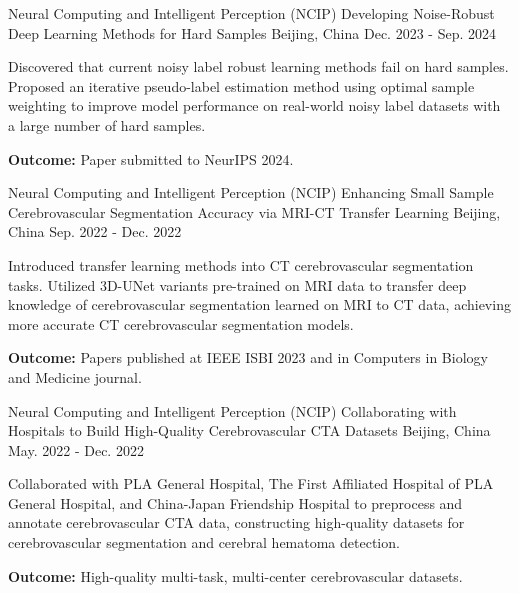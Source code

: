 \begin{cventries}
  \cventry
  {Neural Computing and Intelligent Perception (NCIP)}
  {Developing Noise-Robust Deep Learning Methods for Hard Samples}
  {Beijing, China}
  {Dec. 2023 - Sep. 2024}
  {
    \begin{cvitems}
      \item {Discovered that current noisy label robust learning methods fail on hard samples. Proposed an iterative pseudo-label estimation method using optimal sample weighting to improve model performance on real-world noisy label datasets with a large number of hard samples.}
      \item {\textbf{Outcome:} Paper submitted to NeurIPS 2024.}
    \end{cvitems}
  }
  \expsaddspace
  \cventry
  {Neural Computing and Intelligent Perception (NCIP)}
  {Enhancing Small Sample Cerebrovascular Segmentation Accuracy via MRI-CT Transfer Learning}
  {Beijing, China}
  {Sep. 2022 - Dec. 2022}
  {
    \begin{cvitems}
      \item {Introduced transfer learning methods into CT cerebrovascular segmentation tasks. Utilized 3D-UNet variants pre-trained on MRI data to transfer deep knowledge of cerebrovascular segmentation learned on MRI to CT data, achieving more accurate CT cerebrovascular segmentation models.}
      \item {\textbf{Outcome:} Papers published at IEEE ISBI 2023 and in Computers in Biology and Medicine journal.}
    \end{cvitems}
  }
  \expsaddspace
  \cventry
  {Neural Computing and Intelligent Perception (NCIP)}
  {Collaborating with Hospitals to Build High-Quality Cerebrovascular CTA Datasets}
  {Beijing, China}
  {May. 2022 - Dec. 2022}
  {
    \begin{cvitems}
      \item {Collaborated with PLA General Hospital, The First Affiliated Hospital of PLA General Hospital, and China-Japan Friendship Hospital to preprocess and annotate cerebrovascular CTA data, constructing high-quality datasets for cerebrovascular segmentation and cerebral hematoma detection.}
      \item {\textbf{Outcome:} High-quality multi-task, multi-center cerebrovascular datasets.}
    \end{cvitems}
  }
  \expsaddspace
\end{cventries}
